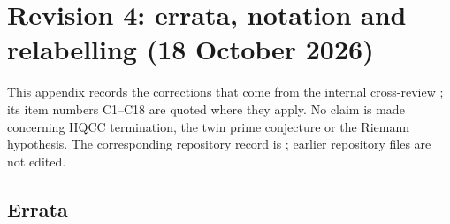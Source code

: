 \section{Revision 4: errata, notation and relabelling (18 October 2026)}\label{app:rev4}
This appendix records the corrections that come from the internal cross-review ; its item numbers C1--C18 are quoted where they apply. No claim is made
concerning HQCC termination, the twin prime conjecture or the Riemann hypothesis. The corresponding repository record is
; earlier repository files are not edited.

\subsection{Errata}
